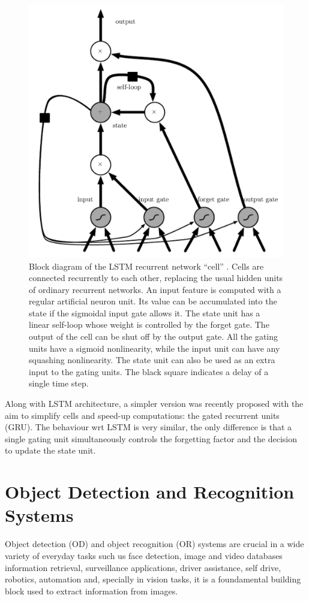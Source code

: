 \begin{figure}
  \centering
  \includegraphics[width=.6\textwidth]{figures/lstm.png}
  \caption[Block diagram of the LSTM recurrent network cell]{
    Block diagram of the LSTM recurrent network ``cell''
    \cite{goodfellow2016deep}. Cells are connected recurrently to each
    other, replacing the usual hidden units of ordinary recurrent
    networks. An input feature is computed with a regular artiﬁcial
    neuron unit. Its value can be accumulated into the state if the
    sigmoidal input gate allows it. The state unit has a linear
    self-loop whose weight is controlled by the forget gate. The
    output of the cell can be shut oﬀ by the output gate. All the
    gating units have a sigmoid nonlinearity, while the input unit can
    have any squashing nonlinearity. The state unit can also be used
    as an extra input to the gating units. The black square indicates
    a delay of a single time step.
  }
  \label{fig:lstm}
\end{figure}

Along with LSTM architecture, a simpler version was recently proposed
with the aim to simplify cells and speed-up computations: the gated
recurrent units (GRU). The behaviour wrt LSTM is very similar, the
only difference is that a single gating unit simultaneously controls
the forgetting factor and the decision to update the state unit.

\section{Object Detection and Recognition Systems}
\label{sec:object-detection-recognition}

Object detection (OD) and object recognition (OR) systems are crucial
in a wide variety of everyday tasks such us face detection, image and
video databases information retrieval, surveillance applications,
driver assistance, self drive, robotics, automation and, specially in
vision tasks, it is a foundamental building block used to extract
information from images.

